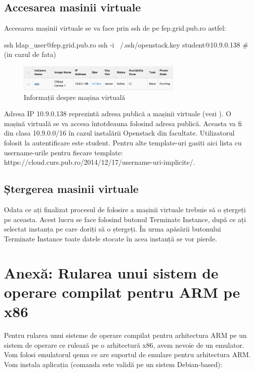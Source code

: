 \subsection{Accesarea masinii virtuale}
\label{sec:vm-openstack-accessvm}

Accesarea mașinii virtuale se va face prin ssh de pe fep.grid.pub.ro astfel:

\begin{screen}
ssh ldap_user@fep.grid.pub.ro
ssh -i ~/.ssh/openstack.key student@10.9.0.138 #(in cazul de fata)
\end{screen}

\begin{figure}[!htbp]
	\centering
	\includegraphics[width=8cm]{chapters/14-vm/img/openstack-short-info-img.png}
	\caption{Informații despre mașina virtuală}
	\label{fig:vm-openstack-info}
\end{figure}

Adresa IP 10.9.0.138 reprezintă adresa publică a mașinii virtuale (vezi
). O mașină virtuală se va accesa
întotdeauna folosind adresa publică. Aceasta va fi din clasa 10.9.0.0/16 în
cazul instalării Openstack din facultate. Utilizatorul folosit la autentificare
este student. Pentru alte template-uri gasiti aici lista cu username-urile
pentru fiecare template:
https://cloud.curs.pub.ro/2014/12/17/username-uri-implicite/.

\subsection{Ștergerea masinii virtuale}
\label{sec:vm-openstack-deletevm}

Odata ce ați finalizat procesul de folosire a mașinii virtuale trebuie să o
ștergeți pe aceasta. Acest lucru se face folosind butonul Terminate Instance,
după ce ați selectat instanța pe care doriți să o ștergeți. În urma apăsării
butonului Terminate Instance toate datele stocate în acea instanță se vor
pierde.

\section{Anexă: Rularea unui sistem de operare compilat pentru ARM pe x86}
\label{sec:vm-arm}

Pentru rularea unui sisteme de operare compilat pentru arhitectura ARM pe un
sistem de operare ce rulează pe o arhitectură x86, avem nevoie de un emulator.
Vom folosi emulatorul qemu ce are suportul de emulare pentru arhitectura ARM.
Vom instala aplicația (comanda este validă pe un sistem Debian-based):

